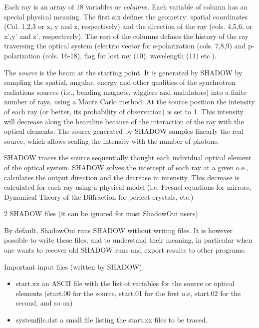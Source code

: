 \documentclass[]{article}
\providecommand{\tightlist}{%
  \setlength{\itemsep}{0pt}\setlength{\parskip}{0pt}}
\begin{document}
Each ray is an array of 18 variables or \emph{column}s. Each variable of
column has an special physical meaning. The first six defines the
geometry: spatial coordinates (Col. 1,2,3 or x, y and z, respectively)
and the direction of the ray (cols. 4,5,6, or x',y' and z',
respectively). The rest of the columns defines the history of the ray
traversing the optical system (electric vector for s-polarization (cols.
7,8,9) and p-polarization (cols. 16-18), flag for lost ray (10),
wavelength (11) etc.).

The \emph{source }is the beam at the starting point. It is generated by
SHADOW by sampling the spatial, angular, energy and other qualities of
the synchrotron radiations sources (i.e., bending magnets, wigglers and
undulators) into a finite number of rays, using a Monte Carlo method. At
the source position the intensity of each ray (or better, its
probability of observation) is set to 1. This intensity will decrease
along the beamline because of the interaction of the ray with the
optical elements. The source generated by SHADOW samples linearly the
real source, which allows scaling the intensity with the number of
photons.

SHADOW traces the source sequentially thought each individual optical
element of the optical system. SHADOW solves the intercept of each ray
at a given o.e., calculates the output direction and the decrease in
intensity. This decrease is calculated for each ray using a physical
model (i.e. Fresnel equations for mirrors, Dynamical Theory of the
Diffraction for perfect crystals, etc.)

2 SHADOW files (it can be ignored for most ShadowOui users)

By default, ShadowOui runs SHADOW without writing files. It is however
possible to write these files, and to understand their meaning, in
particular when one wants to recover old SHADOW runs and export results
to other programs.

Important input files (written by SHADOW):

\begin{itemize}
\tightlist
\item
  start.xx an ASCII file with the list of variables for the source or
  optical elements (start.00 for the source, start.01 for the first o.e,
  start.02 for the second, and so on)
\item
  systemfile.dat a small file listing the start.xx files to be traced.
\end{itemize}
\end{document}

